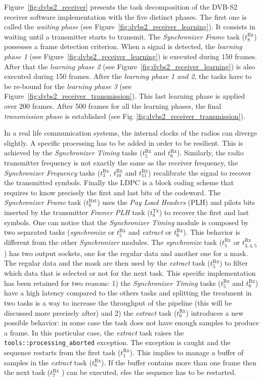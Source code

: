 Figure~\ref{fig:dvbs2_receiver} presents the task decomposition of the DVB-S2
receiver software implementation with the five distinct phases. The first one is
called the \emph{waiting phase} (see Figure~\ref{fig:dvbs2_receiver_learning}).
It consists in waiting until a transmitter starts to transmit. The
\emph{Synchronizer Frame} task ($t^\text{Rx}_8$) possesses a frame detection
criterion. When a signal is detected, the \emph{learning phase 1} (see
Figure~\ref{fig:dvbs2_receiver_learning}) is executed during 150 frames. After
that the \emph{learning phase 2} (see Figure~\ref{fig:dvbs2_receiver_learning})
is also executed during 150 frames. After the \emph{learning phase 1 and 2}, the
tasks have to be re-bound for the \emph{learning phase 3} (see
Figure~\ref{fig:dvbs2_receiver_transmission}). This last learning phase is
applied over 200 frames. After 500 frames for all the learning phases, the final
\emph{transmission phase} is established (see
Fig~\ref{fig:dvbs2_receiver_transmission}).

In a real life communication systems, the internal clocks of the radios can
diverge slightly. A specific processing has to be added in order to be
resilient. This is achieved by the \emph{Synchronizer Timing} tasks
($t^\text{Rx}_5$ and $t^\text{Rx}_6$). Similarly, the radio transmitter
frequency is not exactly the same as the receiver frequency, the
\emph{Synchronizer Frequency} tasks ($t^\text{Rx}_3$, $t^\text{Rx}_{10}$ and
$t^\text{Rx}_{11}$) recalibrate the signal to recover the transmitted symbols.
Finally the LDPC is a block coding scheme that requires to know precisely the
first and last bits of the codeword. The \emph{Synchronizer Frame} task
($t^\text{Rxt}_8$) uses the \emph{Pay Load Headers} (PLH) and pilots bits
inserted by the transmitter \emph{Framer PLH} task ($t^\text{Tx}_8$) to recover
the first and last symbols. One can notice that the \emph{Synchronizer Timing}
module is composed by two separated tasks (\emph{synchronize} or $t^\text{Rx}_5$
and \emph{extract} or $t^\text{Rx}_6$). This behavior is different from the
other \emph{Synchronizer} modules. The \emph{synchronize} task ($t^\text{Rx}_5$
or $t^\text{Rx}_{3,4,5}$) has two output sockets, one for the regular data and
another one for a mask. The regular data and the mask are then used by the
\emph{extract} task ($t^\text{Rx}_5$) to filter which data that is selected or
not for the next task. This specific implementation has been retained for two
reasons: 1) the \emph{Synchronizer Timing} tasks ($t^\text{Rx}_5$ and
$t^\text{Rx}_6$) have a high latency compared to the others tasks and splitting
the treatment in two tasks is a way to increase the throughput of the pipeline
(this will be discussed more precisely after) and 2) the \emph{extract} task
($t^\text{Rx}_6$) introduces a new possible behavior: in some case the task does
not have enough samples to produce a frame. In this particular case, the
\emph{extract} task raises the \verb|tools::processing_aborted| exception. The
exception is caught and the sequence restarts from the first task
($t^\text{Rx}_1$). This implies to manage a buffer of samples in the
\emph{extract} task ($t^\text{Rx}_6$). If the buffer contains more than one
frame then the next task ($t^\text{Rx}_7$ ) can be executed, else the sequence
has to be restarted.

